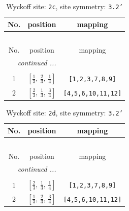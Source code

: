 \documentclass[fleqn,8pt]{jsarticle}
\begin{document}
\renewcommand{\arraystretch}{1.2}
\begin{longtable}{ccc}
\caption{Wyckoff site: {\tt 2c}, site symmetry: {\tt 3.2'}}
 \\
 \hline \hline
No. & position & mapping \\ \hline \endfirsthead

\multicolumn{2}{l}{\tablename\ \thetable{}} \\
 \hline \hline
No. & position & mapping \\ \hline \endhead

 \hline \hline
\multicolumn{2}{r}{\footnotesize\it continued ...} \\ \endfoot

 \hline \hline
\multicolumn{2}{r}{} \\ \endlastfoot

1 & $\left[ \frac{1}{3},\, \frac{2}{3},\, \frac{1}{4} \right]$ & {\tt [1,2,3,7,8,9]} \\ \hline
2 & $\left[ \frac{2}{3},\, \frac{1}{3},\, \frac{3}{4} \right]$ & {\tt [4,5,6,10,11,12]} \\
\end{longtable}
\renewcommand{\arraystretch}{1.2}
\begin{longtable}{ccc}
\caption{Wyckoff site: {\tt 2d}, site symmetry: {\tt 3.2'}}
 \\
 \hline \hline
No. & position & mapping \\ \hline \endfirsthead

\multicolumn{2}{l}{\tablename\ \thetable{}} \\
 \hline \hline
No. & position & mapping \\ \hline \endhead

 \hline \hline
\multicolumn{2}{r}{\footnotesize\it continued ...} \\ \endfoot

 \hline \hline
\multicolumn{2}{r}{} \\ \endlastfoot

1 & $\left[ \frac{2}{3},\, \frac{1}{3},\, \frac{1}{4} \right]$ & {\tt [1,2,3,7,8,9]} \\ \hline
2 & $\left[ \frac{1}{3},\, \frac{2}{3},\, \frac{3}{4} \right]$ & {\tt [4,5,6,10,11,12]} \\
\end{longtable}
\renewcommand{\arraystretch}{1.2}
\end{document}
